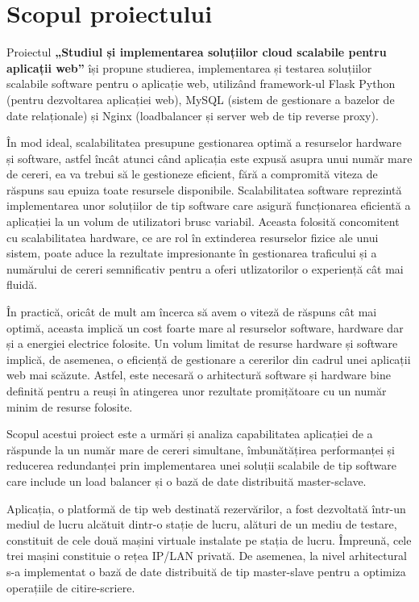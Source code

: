 \documentclass[12pt, a4paper, oneside, romanian]{teza-upb}
\begin{document}
	\section{Scopul proiectului}
	Proiectul \textbf{„Studiul și implementarea soluțiilor cloud scalabile pentru aplicații web”} își propune studierea, implementarea și testarea soluțiilor scalabile software pentru o aplicație web, utilizând framework-ul Flask Python (pentru dezvoltarea aplicației web), MySQL (sistem de gestionare a bazelor de date relaționale) și Nginx (loadbalancer și server web de tip reverse proxy). 
	
	În mod ideal, scalabilitatea presupune gestionarea optimă a resurselor hardware și software, astfel încât atunci când aplicația este expusă asupra unui număr mare de cereri, ea va trebui să le gestioneze eficient, fără a compromită viteza de răspuns sau epuiza toate resursele disponibile. Scalabilitatea software \cite{ss} reprezintă implementarea unor soluțiilor de tip software care asigură funcționarea eficientă a aplicației la un volum de utilizatori brusc variabil. Aceasta folosită concomitent cu scalabilitatea hardware, ce are rol în extinderea resurselor fizice ale unui sistem, poate aduce la rezultate impresionante în gestionarea traficului și a numărului de cereri semnificativ pentru a oferi utlizatorilor o experiență cât mai fluidă.
	
	În practică, oricât de mult am încerca să avem o viteză de răspuns cât mai optimă, aceasta implică un cost foarte mare al resurselor software, hardware dar și a energiei electrice folosite. Un volum limitat de resurse hardware și software implică, de asemenea, o eficiență de gestionare a cererilor din cadrul unei aplicații web mai scăzute. Astfel, este necesară o arhitectură software și hardware bine definită pentru a reuși în atingerea unor rezultate promițătoare cu un număr minim de resurse folosite.
	
	
	Scopul acestui proiect este a urmări și analiza capabilitatea aplicației de a răspunde la un număr mare de cereri simultane, îmbunătățirea performanței și reducerea redundanței prin implementarea unei soluții scalabile de tip software care include un load balancer și o bază de date distribuită master-sclave. 
	
	Aplicația, o platformă de tip web destinată rezervărilor, a fost dezvoltată într-un mediul de lucru alcătuit dintr-o stație de lucru, alături de un mediu de testare, constituit de cele două mașini virtuale instalate pe stația de lucru. Împreună, cele trei mașini constituie o rețea IP/LAN privată. De asemenea, la nivel arhitectural s-a implementat o bază de date distribuită de tip master-slave pentru a optimiza operațiile de citire-scriere.  
	
\end{document}
